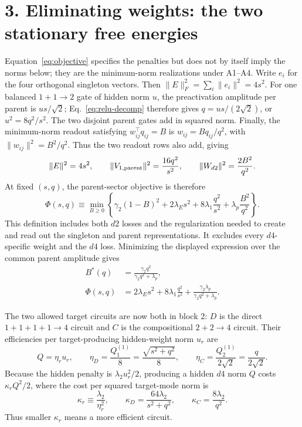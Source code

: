\documentclass[10pt]{article}
\begin{document}
\section*{3. Eliminating weights: the two stationary free energies}
Equation~\eqref{eq:objective} specifies the penalties but does not by itself imply the norms
below; they are the minimum-norm realizations under A1--A4.  Write $e_i$ for the four
orthogonal singleton vectors.  Then $\|E\|_F^2=\sum_i\|e_i\|^2=4s^2$.  For one balanced
$1+1\to2$ gate of hidden norm $u$, the preactivation amplitude per parent is $us/\sqrt2$;
Eq.~\eqref{eq:relu-decomp} therefore gives $q=us/(2\sqrt2)$, or
$u^2=8q^2/s^2$.  The two disjoint parent gates add in squared norm.  Finally, the
minimum-norm readout satisfying $w_{ij}^{\top}q_{ij}=B$ is
$w_{ij}=Bq_{ij}/q^2$, with $\|w_{ij}\|^2=B^2/q^2$.  Thus the two readout rows also add, giving
\begin{equation}
\|E\|^2=4s^2,\qquad
\|V_{1,\rm parent}\|^2=\frac{16q^2}{s^2},\qquad
\|W_{d2}\|^2=\frac{2B^2}{q^2}.
\end{equation}
At fixed $(s,q)$, the parent-sector objective is therefore
\begin{equation}
\Phi(s,q)\equiv\min_{B\geq0}\left\{
\gamma_2(1-B)^2+2\lambda_Es^2+8\lambda_1\frac{q^2}{s^2}
+\lambda_p\frac{B^2}{q^2}\right\}.
\label{eq:phi-definition}
\end{equation}
This definition includes both $d2$ losses and the regularization needed to create and read out
the singleton and parent representations.  It excludes every $d4$-specific weight and the
$d4$ loss.  Minimizing the displayed expression over the common parent amplitude gives
\begin{align}
B^*(q)&=\frac{\gamma_2q^2}{\gamma_2q^2+\lambda_p},\nonumber\\[-2pt]
\Phi(s,q)&=2\lambda_Es^2+8\lambda_1\frac{q^2}{s^2}
+\frac{\gamma_2\lambda_p}{\gamma_2q^2+\lambda_p}.
\label{eq:parent-free}
\end{align}

The two allowed target circuits are now both in block 2: $D$ is the direct
$1+1+1+1\to4$ circuit and $C$ is the compositional $2+2\to4$ circuit.  Their efficiencies
per target-producing hidden-weight norm $u_r$ are
\begin{equation}
Q=\eta_r u_r,\qquad
\eta_D=\frac{Q_1^{(1)}}{8}=\frac{\sqrt{s^2+q^2}}{8},\qquad
\eta_C=\frac{Q_2^{(1)}}{2\sqrt2}=\frac{q}{2\sqrt2}.
\label{eq:etas}
\end{equation}
Because the hidden penalty is $\lambda_2u_r^2/2$, producing a hidden $d4$ norm $Q$ costs
$\kappa_rQ^2/2$, where the cost per squared target-mode norm is
\begin{equation}
\kappa_r\equiv\frac{\lambda_2}{\eta_r^2},\qquad
\kappa_D=\frac{64\lambda_2}{s^2+q^2},\qquad
\kappa_C=\frac{8\lambda_2}{q^2}.
\label{eq:kappas}
\end{equation}
Thus smaller $\kappa_r$ means a more efficient circuit.
\end{document}
